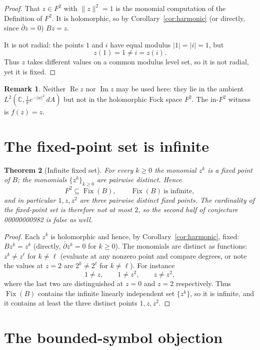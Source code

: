 \documentclass[11pt]{article}
\newtheorem{theorem}{Theorem}
\theoremstyle{definition}
\newtheorem{remark}[theorem]{Remark}
\newcommand{\dA}{\,dA}
\newcommand{\C}{\mathbb{C}}
\newcommand{\dd}{\partial}
\begin{document}
\begin{proof}
That $z\in F^2$ with $\|z\|^2=1$ is the monomial computation of the Definition
of $F^2$. It is holomorphic, so by Corollary~\ref{cor:harmonic} (or directly,
since $\bar\dd z=0$) $Bz=z$.

It is not radial: the points $1$ and $i$ have equal modulus $|1|=|i|=1$, but
\[
  z(1)=1\neq i=z(i).
\]
Thus $z$ takes different values on a common modulus level set, so it is not
radial, yet it is fixed.
\end{proof}

\begin{remark}
Neither $\operatorname{Re}z$ nor $\operatorname{Im}z$ may be used here: they
lie in the ambient $L^2(\C,\frac1\pi e^{-|w|^2}\dA)$ but not in the holomorphic
Fock space $F^2$. The in-$F^2$ witness is $f(z)=z$.
\end{remark}

\section{The fixed-point set is infinite}

\begin{theorem}[Infinite fixed set]\label{thm:infinite}
For every $k\ge0$ the monomial $z^k$ is a fixed point of $B$; the monomials
$\{z^k\}_{k\ge0}$ are pairwise distinct. Hence
\[
  F^2\subseteq \operatorname{Fix}(B),
  \qquad
  \operatorname{Fix}(B)\ \text{is infinite},
\]
and in particular $1,z,z^2$ are three pairwise distinct fixed points. The
cardinality of the fixed-point set is therefore not at most $2$, so the second
half of conjecture 00000000982 is false as well.
\end{theorem}

\begin{proof}
Each $z^k$ is holomorphic and hence, by Corollary~\ref{cor:harmonic}, fixed:
$Bz^k=z^k$ (directly, $\bar\dd z^k=0$ for $k\ge0$). The monomials are distinct
as functions: $z^k\neq z^\ell$ for $k\neq\ell$ (evaluate at any nonzero point
and compare degrees, or note the values at $z=2$ are $2^k\neq2^\ell$ for
$k\neq\ell$). For instance
\[
  1\neq z,\qquad 1\neq z^2,\qquad z\neq z^2,
\]
where the last two are distinguished at $z=0$ and $z=2$ respectively. Thus
$\operatorname{Fix}(B)$ contains the infinite linearly independent set
$\{z^k\}$, so it is infinite, and it contains at least the three distinct
points $1,z,z^2$.
\end{proof}

\section{The bounded-symbol objection}
\end{document}
